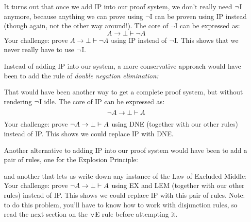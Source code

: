 \begin{earg}
\item It turns out that once we add IP into our proof system, we don't really need $\neg$I anymore, because anything we can prove using $\lnot$I can be proven using IP instead (though again, not the other way around!).  The core of $\lnot$I can be expressed as: $$A \rightarrow \bot \vdash \lnot A$$ Your challenge: prove $A \rightarrow \bot \vdash \lnot A$ using IP  instead of $\neg$I.  This shows that we never really have to use $\neg$I.\\



\item Instead of adding IP into our system, a more conservative approach would have been to add the rule of \emph{double negation elimination:}

That would have been another way to get a complete proof system, but without rendering $\neg$I idle.  The core of IP can be expressed as:
$$\neg A \rightarrow \bot \vdash  A$$
Your challenge: prove $\neg A \rightarrow \bot \vdash  A$ using DNE (together with our other rules) instead of IP.  This shows we could replace IP with DNE.\\

\item Another alternative to adding IP into our proof system would have been to add a pair of rules, one for the Explosion Principle:

and another that lets us write down any instance of the Law of Excluded Middle:
Your challenge: prove $\neg A \rightarrow \bot \vdash  A$ using EX and LEM (together with our other rules)  instead of IP.  This shows we could replace IP with this pair of rules.  Note: to do this problem, you'll have to know how to work with disjunction rules, so read the next section on the $\vee$E rule before attempting  it.

\end{earg}


